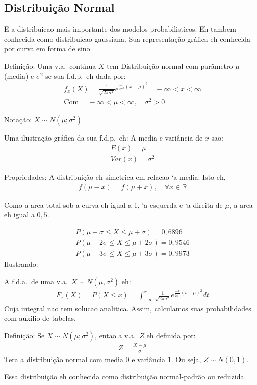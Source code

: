 \documentclass[11pt,a4paper]{book}
\begin{document}
\subsection{Distribuição Normal}
E a distribuicao mais importante dos modelos probabilisticos. 
Eh tambem conhecida como distribuicao gaussiana. Sua representação 
gráfica eh conhecida por curva em forma de sino.
\begin{description}
  \item {Definição:}  Uma v.a.\ contínua $X$ tem Distribuição normal com parâmetro $\mu$ (media) e 
    $\sigma^2$ se sua f.d.p.\ eh dada por:
    \begin{align}
      f_{x} (X)= \frac{1}{\sqrt{2\pi \sigma^2}} e^{\frac{-1}{2\sigma^2} \left( x-\mu \right)^2} \quad -\infty<x<\infty \\
      \text{Com } \quad -\infty < \mu < \infty, \quad \sigma^2>0
    \end{align}
  \item {Notação:} $X \sim N(\mu ; \sigma^2)$

Uma ilustração gráfica da sua f.d.p.\ eh:
A media e variância de $x$ sao:
\begin{align*}
E(x) =\mu \\
Var(x)=\sigma^2
\end{align*}
\item {Propriedades:}
A distribuição eh simetrica em relacao `a media. Isto eh,
\begin{align}
  f(\mu - x) = f(\mu+x), \quad \forall x \in \mathbb{R}
\end{align}
\item Como a area total sob a curva eh igual a 1, `a esquerda e `a direita de $\mu$, 
  a area eh igual a $0,5$.
\item 
  \begin{align*}
    P(\mu -\sigma \leq X \leq \mu+\sigma)= 0,6896\\
    P(\mu -2\sigma \leq X \leq \mu+2\sigma)= 0,9546\\
    P(\mu -3\sigma \leq X \leq \mu+3\sigma)= 0,9973
  \end{align*}
Ilustrando:

A f.d.a.\ de uma v.a.\ $X \sim N(\mu,\sigma^2)$ eh:
\begin{align*}
  F_{x} (X)= P(X \leq x)= \int^{x}_{-\infty} \frac{1}{\sqrt{2\pi \sigma^2}}e^{\frac{-1}{2\sigma^2} \left( t- \mu \right)^2} dt 
\end{align*}
Cuja integral nao tem solucao analitica. Assim, calculamos suas probabilidades com auxilio de tabelas.

\item {Definição}: Se $X \sim N(\mu; \sigma^2)$, entao a v.a.\ $Z$ eh definida por:
  \begin{align}
   Z= \frac{X-\mu}{\sigma} 
  \end{align}
  Tera a distribuição normal com media 0 e variância 1. Ou seja, $Z \sim N(0,1)$.
  
  Essa distribuição eh conhecida como distribuição normal-padrão ou reduzida. 
\end{description}
\end{document}
